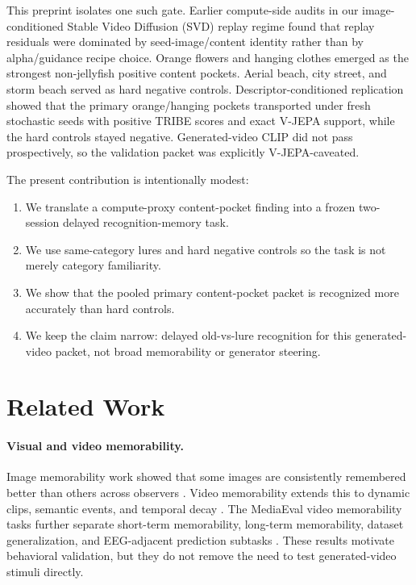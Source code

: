 \documentclass[11pt]{article}
\begin{document}
This preprint isolates one such gate. Earlier compute-side audits in our
image-conditioned Stable Video Diffusion (SVD) replay regime
\citep{blattmann2023stablevideodiffusion} found that replay residuals were
dominated by seed-image/content identity rather than by alpha/guidance recipe
choice. Orange flowers and hanging clothes emerged as the strongest
non-jellyfish positive content pockets. Aerial beach, city street, and storm
beach served as hard negative controls. Descriptor-conditioned replication
showed that the primary orange/hanging pockets transported under fresh
stochastic seeds with positive TRIBE scores and exact V-JEPA support, while the
hard controls stayed negative. Generated-video CLIP did not pass prospectively,
so the validation packet was explicitly V-JEPA-caveated.

The present contribution is intentionally modest:

\begin{enumerate}
  \item We translate a compute-proxy content-pocket finding into a frozen
        two-session delayed recognition-memory task.
  \item We use same-category lures and hard negative controls so the task is not
        merely category familiarity.
  \item We show that the pooled primary content-pocket packet is recognized more
        accurately than hard controls.
  \item We keep the claim narrow: delayed old-vs-lure recognition for this
        generated-video packet, not broad memorability or generator steering.
\end{enumerate}

\section{Related Work}

\paragraph{Visual and video memorability.}
Image memorability work showed that some images are consistently remembered
better than others across observers \citep{isola2011memorability}. Video
memorability extends this to dynamic clips, semantic events, and temporal decay
\citep{cohendet2019videomem,newman2020memento}. The MediaEval video
memorability tasks further separate short-term memorability, long-term
memorability, dataset generalization, and EEG-adjacent prediction subtasks
\citep{sweeney2022mediaeval}. These results motivate behavioral validation, but
they do not remove the need to test generated-video stimuli directly.
\end{document}
